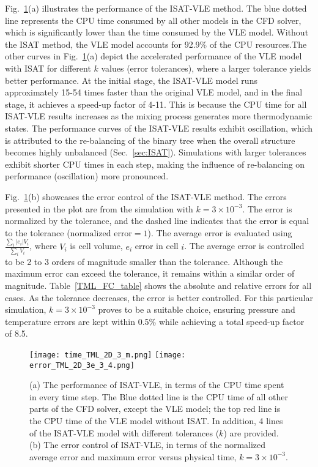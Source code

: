 Fig.~\ref{TML_PE}(a) illustrates the performance of the ISAT-VLE method. The blue dotted line represents the CPU time consumed by all other models in the CFD solver, which is significantly lower than the time consumed by the VLE model. Without the ISAT method, the VLE model accounts for 92.9\% of the CPU resources.The other curves in Fig.~\ref{TML_PE}(a) depict the accelerated performance of the VLE model with ISAT for different $k$ values (error tolerances), where a larger tolerance yields better performance. At the initial stage, the ISAT-VLE model runs approximately 15-54 times faster than the original VLE model, and in the final stage, it achieves a speed-up factor of 4-11. This is because the CPU time for all ISAT-VLE results increases as the mixing process generates more thermodynamic states. The performance curves of the ISAT-VLE results exhibit oscillation, which is attributed to the re-balancing of the binary tree when the overall structure becomes highly unbalanced (Sec.~\ref{sec:ISAT}). Simulations with larger tolerances exhibit shorter CPU times in each step, making the influence of re-balancing on performance (oscillation) more pronounced.


Fig.~\ref{TML_PE}(b) showcases the error control of the ISAT-VLE method. The errors presented in the plot are from the simulation with $k= 3 \times 10^{-3}$. The error is normalized by the tolerance, and the dashed line indicates that the error is equal to the tolerance ($\text{normalized error}=1$). The average error is evaluated using $\frac{\sum_i |e_i|V_i}{\sum_i V_i}$, where $V_i$ is cell volume, $e_i$ error in cell $i$. The average error is controlled to be 2 to 3 orders of magnitude smaller than the tolerance. Although the maximum error can exceed the tolerance, it remains within a similar order of magnitude. Table~\ref{TML_FC_table} shows the absolute and relative errors for all cases. As the tolerance decreases, the error is better controlled. For this particular simulation, $k= 3 \times 10^{-3}$ proves to be a suitable choice, ensuring pressure and temperature errors are kept within 0.5\% while achieving a total speed-up factor of 8.5.



\begin{figure}[htbp]
	\centering
	\texttt{[image: time\_TML\_2D\_3\_m.png]}
	\texttt{[image: error\_TML\_2D\_3e\_3\_4.png]}
	\caption{(a) The performance of ISAT-VLE, in terms of the CPU time spent in every time step. The Blue dotted line is the CPU time of all other parts of the CFD solver, except the VLE model; the top red line is the CPU time of the VLE model without ISAT. In addition, 4 lines of the ISAT-VLE model with different tolerances ($k$) are provided. (b) The error control of ISAT-VLE, in terms of the normalized average error and maximum error versus physical time, $k=3\times 10^{-3}$.}
	\label{TML_PE}
\end{figure}




